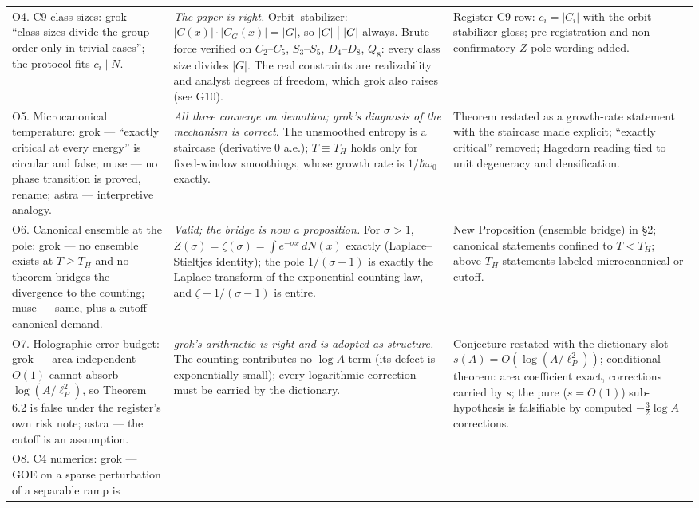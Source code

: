 \documentclass[11pt,a4paper]{article}
\begin{document}
\begin{longtable}{@{}p{}p{}p{}@{}}
O4. C9 class sizes: grok --- ``class sizes divide the group order only in
trivial cases''; the protocol fits $c_i\mid N$. &
\emph{The paper is right.} Orbit--stabilizer: $|C(x)|\cdot|C_G(x)|=|G|$, so
$|C|\bigm| |G|$ always. Brute-force verified on $C_2$--$C_5$, $S_3$--$S_5$,
$D_4$--$D_8$, $Q_8$: every class size divides $|G|$. The real constraints are
realizability and analyst degrees of freedom, which grok also raises
(see G10). &
Register C9 row: $c_i=|C_i|$ with the orbit--stabilizer gloss; pre-registration
and non-confirmatory $Z$-pole wording added.\\
O5. Microcanonical temperature: grok --- ``exactly critical at every energy''
is circular and false; muse --- no phase transition is proved, rename;
astra --- interpretive analogy. &
\emph{All three converge on demotion; grok's diagnosis of the mechanism is
correct.} The unsmoothed entropy is a staircase (derivative $0$ a.e.);
$T\equiv T_H$ holds only for fixed-window smoothings, whose growth rate is
$1/\hbar\omega_0$ exactly. &
Theorem restated as a growth-rate statement with the staircase made explicit;
``exactly critical'' removed; Hagedorn reading tied to unit degeneracy and
densification.\\
O6. Canonical ensemble at the pole: grok --- no ensemble exists at $T\ge T_H$
and no theorem bridges the divergence to the counting; muse --- same, plus a
cutoff-canonical demand. &
\emph{Valid; the bridge is now a proposition.} For $\sigma>1$,
$Z(\sigma)=\zeta(\sigma)=\int e^{-\sigma x}\,dN(x)$ exactly (Laplace--Stieltjes
identity); the pole $1/(\sigma-1)$ is exactly the Laplace transform of the
exponential counting law, and $\zeta-1/(\sigma-1)$ is entire. &
New Proposition (ensemble bridge) in \S2; canonical statements confined to
$T<T_H$; above-$T_H$ statements labeled microcanonical or cutoff.\\
O7. Holographic error budget: grok --- area-independent $O(1)$ cannot absorb
$\log(A/\ell_P^2)$, so Theorem 6.2 is false under the register's own risk note;
astra --- the cutoff is an assumption. &
\emph{grok's arithmetic is right and is adopted as structure.} The counting
contributes no $\log A$ term (its defect is exponentially small); every
logarithmic correction must be carried by the dictionary. &
Conjecture restated with the dictionary slot $s(A)=O(\log(A/\ell_P^2))$;
conditional theorem: area coefficient exact, corrections carried by $s$; the
pure ($s=O(1)$) sub-hypothesis is falsifiable by computed $-\frac32\log A$
corrections.\\
O8. C4 numerics: grok --- GOE on a sparse perturbation of a separable ramp is

\end{longtable}
\end{document}
